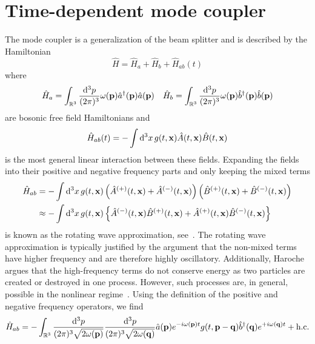 \section{Time-dependent mode coupler}

The mode coupler is a generalization of the beam splitter and is described by the Hamiltonian
\begin{equation}
	\hat{H}
	=
	\hat{H}_a
	+
	\hat{H}_b
	+
	\hat{H}_{ab}(t)
\end{equation}
where
\begin{align}
	\hat{H}_a
	=
	\int_{\mathbb{R}^3}\frac{\dd[3]{p}}{(2\pi)^3}
	\omega(\vb{p})
	\hat{a}^\dagger(\vb{p})
	\hat{a}(\vb{p})
	&&
	\hat{H}_b
	=
	\int_{\mathbb{R}^3}\frac{\dd[3]{p}}{(2\pi)^3}
	\omega(\vb{p})
	\hat{b}^\dagger(\vb{p})
	\hat{b}(\vb{p})
\end{align}
are bosonic free field Hamiltonians and
\begin{equation}
	\hat{H}_{ab}(t)
	=
	-
	\int\dd[3]{x}
	g(t,\vb{x})
	\hat{A}(t,\vb{x})
	\hat{B}(t,\vb{x})
\end{equation}
is the most general linear interaction between these fields.
Expanding the fields into their positive and negative frequency parts and only keeping the mixed terms
\begin{equation}
	\begin{split}
		\hat{H}_{ab}
		&=
		-
		\int\dd[3]{x}
		g(t,\vb{x})
		\left(
			\hat{A}^{(+)}(t,\vb{x})
			+
			\hat{A}^{(-)}(t,\vb{x})
		\right)
		\left(
			\hat{B}^{(+)}(t,\vb{x})
			+
			\hat{B}^{(-)}(t,\vb{x})
		\right)
		\\
		&\approx
		-
		\int\dd[3]{x}
		g(t,\vb{x})
		\left\{
			\hat{A}^{(-)}(t,\vb{x})
			\hat{B}^{(+)}(t,\vb{x})
			+
			\hat{A}^{(+)}(t,\vb{x})
			\hat{B}^{(-)}(t,\vb{x})
		\right\}
	\end{split}
\end{equation}
is known as the rotating wave approximation, see~\cite[p.~158]{Gardiner2000}.
The rotating wave approximation is typically justified by the argument that the non-mixed terms have higher frequency and are therefore highly oscillatory.
Additionally, Haroche~\cite[p.~127]{Haroche2006} argues that the high-frequency terms do not conserve energy as two particles are created or destroyed in one process.
However, such processes are, in general, possible in the nonlinear regime~\cite{QuesadaMejia2015}.
Using the definition of the positive and negative frequency operators, we find
\begin{equation}
	\hat{H}_{ab}
	=
	-
	\int_{\mathbb{R}^3}
	\frac{\dd[3]{p}}{(2\pi)^3\sqrt{2\omega(\vb{p})}}
	\frac{\dd[3]{p}}{(2\pi)^3\sqrt{2\omega(\vb{q})}}
	\hat{a}(\vb{p})
	e^{-i\omega(\vb{p})t}
	g(t,\vb{p}-\vb{q})
	\hat{b}^\dagger(\vb{q})
	e^{+i\omega(\vb{q})t}
	+
	\text{h.c.}
\end{equation}
